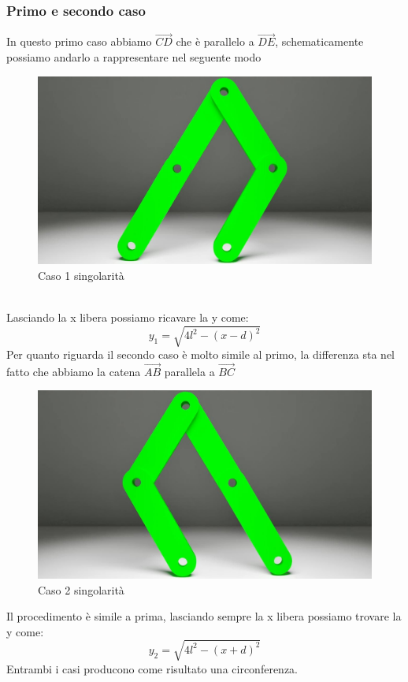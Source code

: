 \subsubsection*{Primo e secondo caso}
In questo primo caso abbiamo $\overrightarrow{CD}$ che è parallelo a $\overrightarrow{DE}$, schematicamente possiamo andarlo a rappresentare nel seguente modo
\begin{figure}[ht]
	\begin{center}
		\includegraphics[scale=0.4]{Immagini/Singolarity/1}
		\caption{Caso 1 singolarità}
	\end{center}
\end{figure}
\\Lasciando la x libera possiamo ricavare la y come:
\begin{equation}
    y_1 = \sqrt{4l^2-(x-d)^2}
\end{equation}
Per quanto riguarda il secondo caso è molto simile al primo, la differenza sta nel fatto che abbiamo la catena $\overrightarrow{AB}$ parallela a $\overrightarrow{BC}$ 
\begin{figure}[ht]
	\begin{center}
		\includegraphics[scale=0.4]{Immagini/Singolarity/2}
		\caption{Caso 2 singolarità}
	\end{center}
\end{figure}
Il procedimento è simile a prima, lasciando sempre la x libera possiamo trovare la y come:
\begin{equation}
    y_2 = \sqrt{4l^2-(x+d)^2}
\end{equation}
Entrambi i casi producono come risultato una circonferenza.
